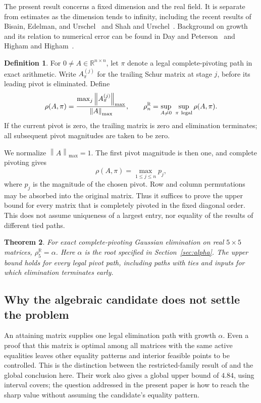 \documentclass[11pt,reqno]{amsart}
\newtheorem{theorem}{Theorem}[section]
\theoremstyle{definition}
\newtheorem{definition}[theorem]{Definition}
\theoremstyle{remark}
\newcommand{\R}{\mathbb R}
\newcommand{\mx}[1]{\left\|#1\right\|_{\max}}
\begin{document}
The present result concerns a fixed dimension and the real field.
It is separate from estimates as the dimension tends to infinity,
including the recent results of
Bisain, Edelman, and Urschel~\cite{BisainEdelmanUrschel2025} and
Shah and Urschel~\cite{ShahUrschel2026}.
Background on growth and its relation to numerical error can be found in
Day and Peterson~\cite{DayPeterson1988} and
Higham and Higham~\cite{HighamHigham1989}.

\begin{definition}
For \(0\ne A\in\R^{n\times n}\), let \(\pi\) denote a legal complete-pivoting
path in exact arithmetic. Write \(A^{(j)}_\pi\) for the trailing Schur
matrix at stage \(j\), before its leading pivot is eliminated. Define
\[
\rho(A,\pi)=
\frac{\max_j\mx{A^{(j)}_\pi}}{\mx A},
\qquad
\rho_n^\R=\sup_{A\ne0}\ \sup_{\pi\ {\rm legal}}\rho(A,\pi).
\]
If the current pivot is zero, the trailing matrix is zero and elimination
terminates; all subsequent pivot magnitudes are taken to be zero.
\end{definition}

We normalize \(\mx A=1\). The first pivot magnitude is then one, and
complete pivoting gives
\begin{equation}\label{eq:growthpivots}
\rho(A,\pi)=\max_{1\le j\le n}p_j,
\end{equation}
where \(p_j\) is the magnitude of the chosen pivot. Row and column
permutations may be absorbed into the original matrix. Thus it suffices
to prove the upper bound for every matrix that is completely pivoted in
the fixed diagonal order. This does not assume uniqueness of a largest
entry, nor equality of the results of different tied paths.

\begin{theorem}\label{thm:main}
For exact complete-pivoting Gaussian elimination on real \(5\times5\)
matrices, \(\rho_5^\R=\alpha\).
Here \(\alpha\) is the root specified in
Section~\ref{sec:alpha}. The upper bound holds for every legal pivot path,
including paths with ties and inputs for which elimination terminates
early.
\end{theorem}

\subsection*{Why the algebraic candidate does not settle the problem}
An attaining matrix supplies one legal elimination path with growth
\(\alpha\). Even a proof that this matrix is optimal among all matrices
with the same active equalities leaves other equality patterns and
interior feasible points to be controlled. This is the distinction between
the restricted-family result of
\cite[Theorem~2.2]{ChenEdelmanUrschel2026} and the global conclusion here.
Their work also gives a global upper bound of \(4.84\), using interval
covers; the question addressed in the present paper is how to reach the
sharp value without assuming the candidate's equality pattern.
\end{document}
